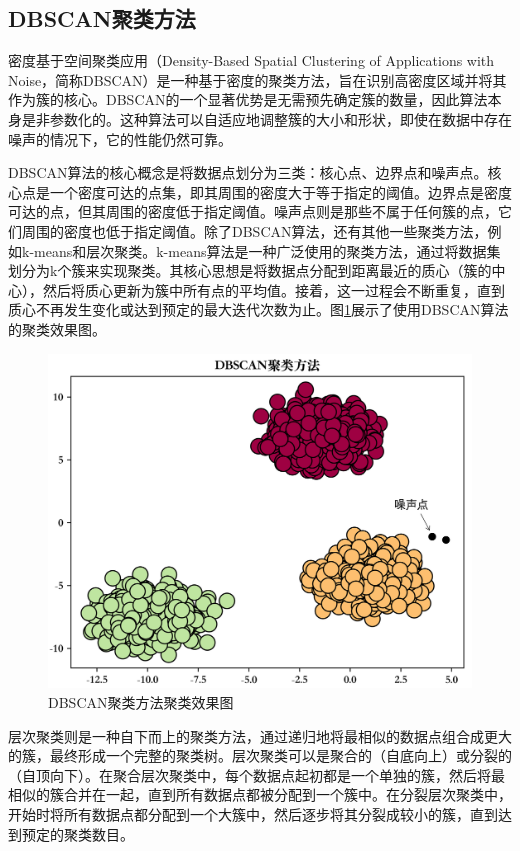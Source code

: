 \subsection{DBSCAN聚类方法}
密度基于空间聚类应用（Density-Based Spatial Clustering of Applications with Noise，简称DBSCAN）是一种基于密度的聚类方法，旨在识别高密度区域并将其作为簇的核心。DBSCAN的一个显著优势是无需预先确定簇的数量，因此算法本身是非参数化的。这种算法可以自适应地调整簇的大小和形状，即使在数据中存在噪声的情况下，它的性能仍然可靠。

DBSCAN算法的核心概念是将数据点划分为三类：核心点、边界点和噪声点。核心点是一个密度可达的点集，即其周围的密度大于等于指定的阈值。边界点是密度可达的点，但其周围的密度低于指定阈值。噪声点则是那些不属于任何簇的点，它们周围的密度也低于指定阈值。除了DBSCAN算法，还有其他一些聚类方法，例如k-means和层次聚类。k-means算法是一种广泛使用的聚类方法，通过将数据集划分为k个簇来实现聚类。其核心思想是将数据点分配到距离最近的质心（簇的中心），然后将质心更新为簇中所有点的平均值。接着，这一过程会不断重复，直到质心不再发生变化或达到预定的最大迭代次数为止。图\ref{pic_cluster}展示了使用DBSCAN算法的聚类效果图。


\begin{figure}
  \centering
  \includegraphics[width=.75\linewidth]{figures/content/cluster.png}
  \caption{DBSCAN聚类方法聚类效果图}
  \label{pic_cluster}
\end{figure}

层次聚类则是一种自下而上的聚类方法，通过递归地将最相似的数据点组合成更大的簇，最终形成一个完整的聚类树。层次聚类可以是聚合的（自底向上）或分裂的（自顶向下）。在聚合层次聚类中，每个数据点起初都是一个单独的簇，然后将最相似的簇合并在一起，直到所有数据点都被分配到一个簇中。在分裂层次聚类中，开始时将所有数据点都分配到一个大簇中，然后逐步将其分裂成较小的簇，直到达到预定的聚类数目。


